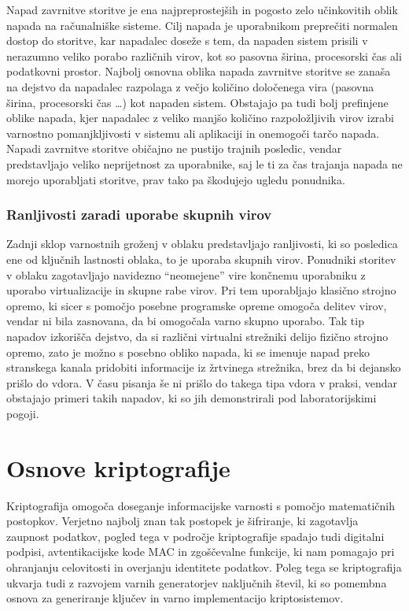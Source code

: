 \documentclass[12pt,a4paper,openany,tikz]{book}
\theoremstyle{plain}
\theoremstyle{definition}
\begin{document}
Napad zavrnitve storitve je ena najpreprostejših in pogosto zelo učinkovitih oblik napada na računalniške sisteme. Cilj napada je uporabnikom preprečiti normalen dostop do storitve, kar napadalec doseže s tem, da napaden sistem prisili v nerazumno veliko porabo različnih virov, kot so pasovna širina, procesorski čas ali podatkovni prostor. Najbolj osnovna oblika napada zavrnitve storitve se zanaša na dejstvo da napadalec razpolaga z večjo količino določenega vira (pasovna širina, procesorski čas …) kot napaden sistem. Obstajajo pa tudi bolj prefinjene oblike napada, kjer napadalec z veliko manjšo količino razpoložljivih virov izrabi varnostno pomanjkljivosti v sistemu ali aplikaciji in onemogoči tarčo napada. Napadi zavrnitve storitve običajno ne pustijo trajnih posledic, vendar predstavljajo veliko neprijetnost za uporabnike, saj le ti za čas trajanja napada ne morejo uporabljati storitve, prav tako pa škodujejo ugledu ponudnika.

\subsection{Ranljivosti zaradi uporabe skupnih virov}
\label{sub:Ranljivosti zaradi uporabe skupnih virov}

Zadnji sklop varnostnih groženj v oblaku predstavljajo ranljivosti, ki so posledica ene od ključnih lastnosti oblaka, to je uporaba skupnih virov. Ponudniki storitev v oblaku zagotavljajo navidezno ``neomejene'' vire končnemu uporabniku z uporabo virtualizacije in skupne rabe virov. Pri tem uporabljajo klasično strojno opremo, ki sicer s pomočjo posebne programske opreme omogoča delitev virov, vendar ni bila zasnovana, da bi omogočala varno skupno uporabo. Tak tip napadov izkorišča dejstvo, da si različni virtualni strežniki delijo fizično strojno opremo, zato je možno s posebno obliko napada, ki se imenuje napad preko stranskega kanala pridobiti informacije iz žrtvinega strežnika, brez da bi dejansko prišlo do vdora. V času pisanja še ni prišlo do takega tipa vdora v praksi, vendar obstajajo primeri takih napadov, ki so jih demonstrirali pod laboratorijskimi pogoji.

\chapter{Osnove kriptografije}

Kriptografija omogoča doseganje informacijske varnosti s pomočjo matematičnih postopkov. Verjetno najbolj znan tak postopek je šifriranje, ki zagotavlja zaupnost podatkov, pogled tega v področje kriptografije spadajo tudi digitalni podpisi, avtentikacijske kode MAC in zgoščevalne funkcije, ki nam pomagajo pri ohranjanju celovitosti in overjanju identitete podatkov. Poleg tega se kriptografija ukvarja tudi z razvojem varnih generatorjev naključnih števil, ki so pomembna osnova za generiranje ključev in varno implementacijo kriptosistemov.
\end{document}

